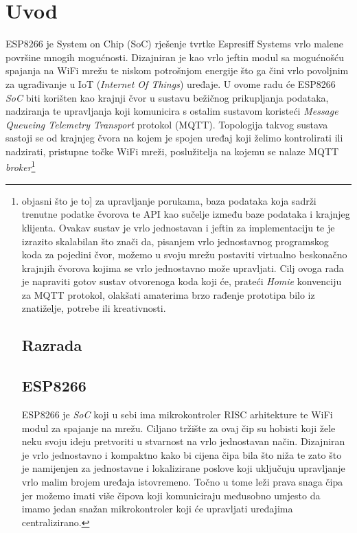 \documentclass[times, utf8, zavrsni]{fer}
\begin{document}
\chapter{Uvod}
ESP8266 je System on Chip (SoC) rješenje tvrtke Espresiff Systems vrlo malene površine mnogih mogućnosti.
Dizajniran je kao vrlo jeftin modul sa mogućnošću spajanja na WiFi mrežu te niskom potrošnjom energije što ga čini vrlo povoljnim za ugrađivanje u IoT (\textit{Internet Of Things}) uređaje.
U ovome radu će ESP8266 \textit{SoC} biti korišten kao krajnji čvor u sustavu bežičnog prikupljanja podataka, nadziranja te upravljanja koji komunicira s ostalim sustavom koristeći \textit{Message Queueing Telemetry Transport} protokol (MQTT).
Topologija takvog sustava sastoji se od krajnjeg čvora na kojem je spojen uređaj koji želimo kontrolirati ili nadzirati, pristupne točke WiFi mreži, poslužitelja na kojemu se nalaze MQTT \textit{broker}\footnote{objasni što je to] za upravljanje porukama, baza podataka koja sadrži trenutne podatke čvorova te API kao sučelje između baze podataka i krajnjeg klijenta.
Ovakav sustav je vrlo jednostavan i jeftin za implementaciju te je izrazito skalabilan što znači da, pisanjem vrlo jednostavnog programskog koda za pojedini čvor, možemo u svoju mrežu postaviti virtualno beskonačno krajnjih čvorova kojima se vrlo jednostavno može upravljati. 
Cilj ovoga rada je napraviti gotov sustav otvorenoga koda koji će, prateći \textit{Homie} konvenciju za MQTT protokol, olakšati amaterima brzo rađenje prototipa bilo iz znatiželje, potrebe ili kreativnosti.

\chapter{Razrada}

\section{ESP8266}
ESP8266 je \textit{SoC} koji u sebi ima mikrokontroler RISC arhitekture te WiFi modul za spajanje na mrežu.
Ciljano tržište za ovaj čip su hobisti koji žele neku svoju ideju pretvoriti u stvarnost na vrlo jednostavan način.
Dizajniran je vrlo jednostavno i kompaktno kako bi cijena čipa bila što niža te zato što je namijenjen za jednostavne i lokalizirane poslove koji uključuju upravljanje vrlo malim brojem uređaja istovremeno.
Točno u tome leži prava snaga čipa jer možemo imati više čipova koji komuniciraju međusobno umjesto da imamo jedan snažan mikrokontroler koji će upravljati uređajima centralizirano.

}
\end{document}
